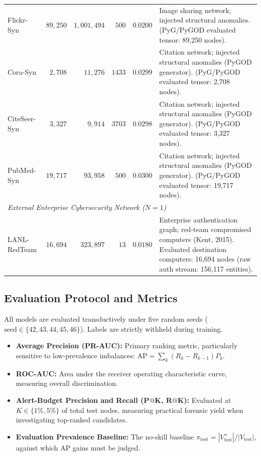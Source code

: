 \documentclass[applsci,article,submit,moreauthors,pdftex]{Definitions/mdpi}
\begin{document}
\begin{table}[htbp]
\begin{tabularx}{\textwidth}{lrrrrX}
Flickr-Syn & $89,250$ & $1,001,494$ & $500$ & $0.0200$ & Image sharing network; injected structural anomalies. (PyG/PyGOD evaluated tensor: 89,250 nodes). \\
Cora-Syn & $2,708$ & $11,276$ & $1433$ & $0.0299$ & Citation network; injected structural anomalies (PyGOD generator). (PyG/PyGOD evaluated tensor: 2,708 nodes). \\
CiteSeer-Syn & $3,327$ & $9,914$ & $3703$ & $0.0298$ & Citation network; injected structural anomalies (PyGOD generator). (PyG/PyGOD evaluated tensor: 3,327 nodes). \\
PubMed-Syn & $19,717$ & $93,958$ & $500$ & $0.0300$ & Citation network; injected structural anomalies (PyGOD generator). (PyG/PyGOD evaluated tensor: 19,717 nodes). \\
\midrule
\multicolumn{6}{l}{\textit{External Enterprise Cybersecurity Network ($N=1$)}} \\
LANL-RedTeam & $16,694$ & $323,897$ & $13$ & $0.0180$ & Enterprise authentication graph; red-team compromised computers (Kent, 2015). Evaluated destination computers: 16,694 nodes (raw auth stream: 156,117 entities). \\
\bottomrule
\end{tabularx}
\end{table}

\subsection{Evaluation Protocol and Metrics}
All models are evaluated transductively under five random seeds ($\text{seed} \in \{42, 43, 44, 45, 46\}$). Labels are strictly withheld during training.
\begin{itemize}
    \item \textbf{Average Precision (PR-AUC):} Primary ranking metric, particularly sensitive to low-prevalence imbalances: $\mathrm{AP} = \sum_k (R_k - R_{k-1}) P_k$.
    \item \textbf{ROC-AUC:} Area under the receiver operating characteristic curve, measuring overall discrimination.
    \item \textbf{Alert-Budget Precision and Recall ($\mathbf{P@K}$, $\mathbf{R@K}$):} Evaluated at $K \in \{1\%, 5\%\}$ of total test nodes, measuring practical forensic yield when investigating top-ranked candidates.
    \item \textbf{Evaluation Prevalence Baseline:} The no-skill baseline $\pi_{\mathrm{test}} = |V_{\mathrm{test}}^+| / |V_{\mathrm{test}}|$, against which AP gains must be judged.
\end{itemize}
\end{document}

